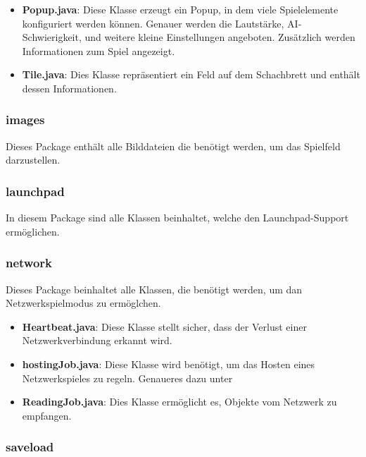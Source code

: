 \documentclass[12pt,a4paper]{article}
\begin{document}
{\begin{itemize}
	\item{\textbf{Popup.java}: Diese Klasse erzeugt ein Popup, in dem viele Spielelemente konfiguriert werden können. Genauer werden die Lautstärke, AI-Schwierigkeit, und weitere kleine Einstellungen angeboten. Zusätzlich werden Informationen zum Spiel angezeigt. }
	
	\item{\textbf{Tile.java}: Dies Klasse repräsentiert ein Feld auf dem Schachbrett und enthält dessen Informationen.}

\end{itemize}

\subsubsection{images}

Dieses Package enthält alle Bilddateien die benötigt werden, um das Spielfeld darzustellen. 

\subsubsection{launchpad}

In diesem Package sind alle Klassen beinhaltet, welche den Launchpad-Support ermöglichen. 


\subsubsection{network}

Dieses Package beinhaltet alle Klassen, die benötigt werden, um dan Netzwerkspielmodus zu ermöglchen.

\begin{itemize}
	\item{\textbf{Heartbeat.java}: Diese Klasse stellt sicher, dass der Verlust einer Netzwerkverbindung erkannt wird.}
	\item{\textbf{hostingJob.java}: Diese Klasse wird benötigt, um das Hosten eines Netzwerkspieles zu regeln. Genaueres dazu unter} %
	\item{\textbf{ReadingJob.java}: Dies Klasse ermöglicht es, Objekte vom Netzwerk zu empfangen. }
\end{itemize}

\subsubsection{saveload}

}
\end{document}
